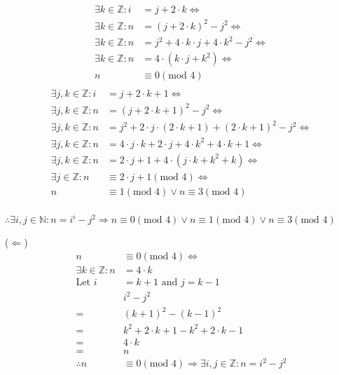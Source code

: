 \documentclass[10pt,\jkfside,a4paper]{article}
\begin{document}
\begin{enumerate}
\begin{equation}
\begin{split}
\exists k \in \mathbb{Z}: i &= j + 2\cdot k\Longleftrightarrow\\
\exists k \in \mathbb{Z}: n &= (j + 2\cdot k)^2 - j^2\Longleftrightarrow\\
\exists k \in \mathbb{Z}: n &= j^2 + 4\cdot k \cdot j + 4\cdot k^2 - j^2 \Longleftrightarrow\\
\exists k \in \mathbb{Z}: n &= 4\cdot (k\cdot j + k^2)\Longleftrightarrow\\
n &\equiv 0(\text{mod } 4)\\
\end{split}
\end{equation}
\begin{equation}
\begin{split}
\exists j, k \in \mathbb{Z}: i &= j + 2\cdot k + 1\Longleftrightarrow\\
\exists j, k \in \mathbb{Z}: n &= (j + 2\cdot k + 1)^2 - j^2\Longleftrightarrow\\
\exists j, k \in \mathbb{Z}: n &= j^2 + 2\cdot j \cdot (2\cdot k + 1) + (2\cdot k + 1)^2 - j^2\Longleftrightarrow\\
\exists j, k \in \mathbb{Z}: n &= 4\cdot j\cdot k + 2\cdot j + 4\cdot k^2 + 4\cdot k + 1\Longleftrightarrow\\
\exists j, k \in \mathbb{Z}: n &= 2\cdot j + 1 + 4\cdot (j\cdot k + k^2 + k)\Longleftrightarrow\\
\exists j \in \mathbb{Z}: n &\equiv 2\cdot j + 1(\text{mod } 4)\Longleftrightarrow\\
n &\equiv 1(\text{mod } 4)\vee n \equiv 3(\text{mod } 4)\\
\end{split}
\end{equation}
\begin{center}
$\therefore \exists i, j \in \mathbb{N}: n = i^i - j^2 \Longrightarrow n \equiv 0(\text{mod } 4) \vee n \equiv 1(\text{mod } 4) \vee n \equiv 3(\text{mod } 4)$
\end{center}
\vspace{0.2em}
($\Longleftarrow$)
\begin{equation}
\begin{split}
n &\equiv 0 (\text{mod } 4)\Longleftrightarrow\\
\exists k \in \mathbb{Z}: n &= 4\cdot k\\
\text{Let } i &= k + 1 \text{ and } j = k - 1\\
& i^2 - j^2\\
=& (k + 1)^2 - (k - 1)^2\\
=& k^2 + 2\cdot k + 1 - k^2 + 2\cdot k - 1\\
=& 4\cdot k\\
=& n\\
\therefore n &\equiv 0(\text{mod } 4) \Longrightarrow \exists i, j \in \mathbb{Z}: n= i^2 - j^2\\
\end{split}
\end{equation}


\end{enumerate}
\end{document}

